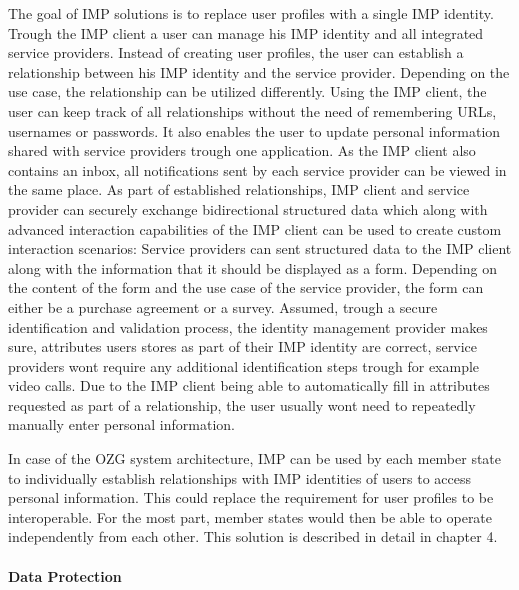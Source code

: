 The goal of IMP solutions is to replace user profiles with a single IMP identity. Trough the IMP client a user can manage his IMP identity and all integrated service providers. Instead of creating user profiles, the user can establish a relationship between his IMP identity and the service provider. Depending on the use case, the relationship can be utilized differently. Using the IMP client, the user can keep track of all relationships without the need of remembering URLs, usernames or passwords. It also enables the user to update personal information shared with service providers trough one application. As the IMP client also contains an inbox, all notifications sent by each service provider can be viewed in the same place. As part of established relationships, IMP client and service provider can securely exchange bidirectional structured data which along with advanced interaction capabilities of the IMP client can be used to create custom interaction scenarios: Service providers can sent structured data to the IMP client along with the information that it should be displayed as a form. Depending on the content of the form and the use case of the service provider, the form can either be a purchase agreement or a survey. Assumed, trough a secure identification and validation process, the identity management provider makes sure, attributes users stores as part of their IMP identity are correct, service providers wont require any additional identification steps trough for example video calls. Due to the IMP client being able to automatically fill in attributes requested as part of a relationship, the user usually wont need to repeatedly manually enter personal information.

In case of the OZG system architecture, IMP can be used by each member state to individually establish relationships with IMP identities of users to access personal information. This could replace the requirement for user profiles to be interoperable. For the most part, member states would then be able to operate independently from each other. This solution is described in detail in chapter 4.

\paragraph{Data Protection}

